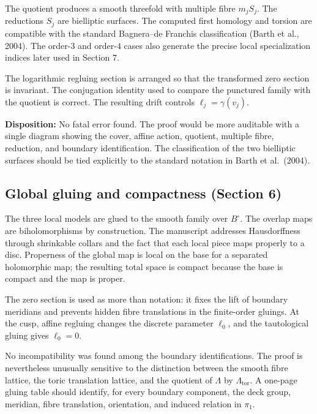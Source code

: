 \documentclass[
  10pt,
  letterpaper,
]{article}
\begin{document}
The quotient produces a smooth threefold with multiple fibre \(m_jS_j\).
The reductions \(S_j\) are bielliptic surfaces. The computed first
homology and torsion are compatible with the standard Bagnera--de
Franchis classification (Barth et al., 2004). The order-\(3\) and
order-\(4\) cases also generate the precise local specialization indices
later used in Section 7.

The logarithmic regluing section is arranged so that the transformed
zero section is invariant. The conjugation identity used to compare the
punctured family with the quotient is correct. The resulting drift
controls \(\ell_j=\gamma(v_j)\).

\textbf{Disposition:} No fatal error found. The proof would be more
auditable with a single diagram showing the cover, affine action,
quotient, multiple fibre, reduction, and boundary identification. The
classification of the two bielliptic surfaces should be tied explicitly
to the standard notation in Barth et al.~(2004).

\subsection{Global gluing and compactness (Section
6)}\label{global-gluing-and-compactness-section-6}

The three local models are glued to the smooth family over \(B^\circ\).
The overlap maps are biholomorphisms by construction. The manuscript
addresses Hausdorffness through shrinkable collars and the fact that
each local piece maps properly to a disc. Properness of the global map
is local on the base for a separated holomorphic map; the resulting
total space is compact because the base is compact and the map is
proper.

The zero section is used as more than notation: it fixes the lift of
boundary meridians and prevents hidden fibre translations in the
finite-order gluings. At the cusp, affine regluing changes the discrete
parameter \(\ell_0\), and the tautological gluing gives \(\ell_0=0\).

No incompatibility was found among the boundary identifications. The
proof is nevertheless unusually sensitive to the distinction between the
smooth fibre lattice, the toric translation lattice, and the quotient of
\(\Lambda\) by \(\Lambda_{\mathrm{tor}}\). A one-page gluing table
should identify, for every boundary component, the deck group, meridian,
fibre translation, orientation, and induced relation in \(\pi_1\).
\end{document}
